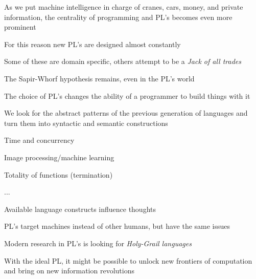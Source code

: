 \documentclass{beamer}
\begin{document}
\begin{slide}{
\item As we put machine intelligence in charge of cranes, cars, money, and private information, the centrality of programming and PL's becomes even more prominent
\item For this reason new PL's are designed almost constantly
\item Some of these are domain specific, others attempt to be a \textit{Jack of all trades}
}\end{slide}

\begin{slide}{
\item The Sapir-Whorf hypothesis remains, even in the PL's world
\item The choice of PL's changes the ability of a programmer to build things with it
\item We look for the abstract patterns of the previous generation of languages and turn them into syntactic and semantic constructions
}\end{slide}

\begin{slide}{
\item Time and concurrency
\item Image processing/machine learning
\item Totality of functions (termination)
\item ...
}\end{slide}

\begin{slide}{
\item Available language constructs influence thoughts
\item PL's target machines instead of other humans, but have the same issues
\item Modern research in PL's is looking for \textit{Holy-Grail languages}
\item With the ideal PL, it might be possible to unlock new frontiers of computation and bring on new information revolutions
}\end{slide}

\begin{thankyou}
\end{thankyou}
\end{document}
